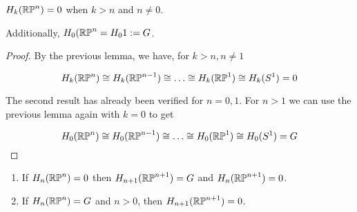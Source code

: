\begin{corollary}
\label{homology-large-n}
$H_k(\mathbb{RP}^{n})=0$ when $k>n$ and $n\neq 0$.

Additionally, $H_0(\mathbb{RP}^{n}=H_0 1:=G$.
\end{corollary}
\begin{proof}
By the previous lemma, we have, for $k>n, n\neq 1$

$$H_k(\mathbb{RP}^{n})\cong H_k(\mathbb{RP}^{n-1})\cong \dots \cong H_k(\mathbb{RP}^{1})\cong H_k(S^1)=0$$

The second result has already been verified for $n=0,1$. For $n>1$ we can use the previous lemma again with $k=0$ to get 

$$H_0(\mathbb{RP}^{n})\cong H_0(\mathbb{RP}^{n-1})\cong \dots \cong H_0(\mathbb{RP}^{1})\cong H_0(S^1)=G$$
\end{proof}

\begin{lemma}
\begin{enumerate}[i]
\item If $H_n(\mathbb{RP}^{n})=0$ then $H_{n+1}(\mathbb{RP}^{n+1})=G$ and $H_{n}(\mathbb{RP}^{n+1})=0$.
\item If $H_n(\mathbb{RP}^{n})=G$ and $n>0$, then $H_{n+1}(\mathbb{RP}^{n+1})=0$.
\end{enumerate}
\end{lemma}

